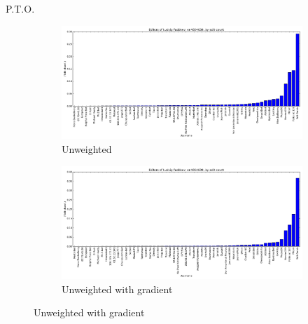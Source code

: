P.T.O.
\clearpage
\begin{figure}
  \caption{English Wikipedia, Page ID 4854639 (Ludvig Faddeev)}
  \centering

  \begin{subfigure}[b]{0.7\linewidth}
    \centering
    \includegraphics[width=\linewidth]{img/weightings/LudvigFaddeevUnweighted.png}
    \caption{Unweighted}
  \end{subfigure}
  \begin{subfigure}[b]{0.7\linewidth}
    \centering
    \includegraphics[width=\linewidth]{img/weightings/LudvigFaddeevUnweightedGradient.png}
    \caption{Unweighted with gradient}
  \end{subfigure}
  

\end{figure}
